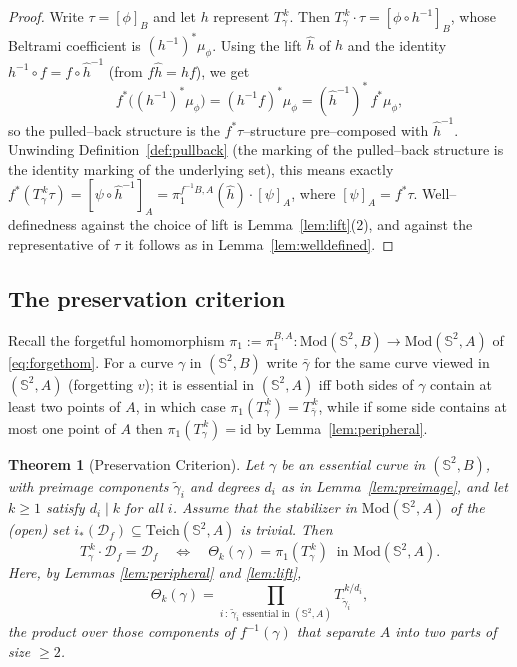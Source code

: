 \documentclass[11pt]{amsart}
\theoremstyle{plain}
\newtheorem{theorem}{Theorem}[section]
\theoremstyle{definition}
\newcommand{\Sph}{\mathbb{S}^2}
\newcommand{\Teich}{\mathrm{Teich}}
\newcommand{\Mod}{\mathrm{Mod}}
\newcommand{\D}{\mathcal{D}}
\newcommand{\id}{\mathrm{id}}
\begin{document}
\begin{proof}
Write $\tau=[\phi]_B$ and let $h$ represent $T_\gamma^{\,k}$.  Then
$T_\gamma^{\,k}\cdot\tau=[\phi\circ h^{-1}]_B$, whose Beltrami coefficient
is $(h^{-1})^{*}\mu_\phi$.  Using the lift $\widehat h$ of $h$ and the
identity $h^{-1}\circ f=f\circ\widehat h^{-1}$ (from
$f\widehat h=hf$), we get
$$f^{*}\bigl((h^{-1})^{*}\mu_\phi\bigr)
=(h^{-1}f)^{*}\mu_\phi=(\widehat h^{-1})^{*}\,f^{*}\mu_\phi,$$
so the pulled--back structure is the $f^{*}\tau$--structure pre--composed
with $\widehat h^{-1}$.  Unwinding
Definition~\ref{def:pullback} (the marking of the pulled--back structure is
the identity marking of the underlying set), this means exactly
$f^{*}(T_\gamma^{\,k}\tau)=[\psi\circ\widehat h^{-1}]_A
=\pi_1^{f^{-1}B,A}(\widehat h)\cdot[\psi]_A$,
where $[\psi]_A=f^{*}\tau$.  Well--definedness against the choice of lift
is Lemma~\ref{lem:lift}(2), and against the representative of $\tau$ it
follows as in Lemma~\ref{lem:welldefined}.
\end{proof}

\subsection{The preservation criterion}

Recall the forgetful homomorphism
$\pi_1:=\pi_1^{B,A}:\Mod(\Sph,B)\to\Mod(\Sph,A)$ of \eqref{eq:forgethom}.
For a curve $\gamma$ in $(\Sph,B)$ write $\bar\gamma$ for the same curve
viewed in $(\Sph,A)$ (forgetting $v$); it is essential in $(\Sph,A)$ iff
both sides of $\gamma$ contain at least two points of $A$, in which case
$\pi_1(T_\gamma^{\,k})=T_{\bar\gamma}^{\,k}$, while if some side contains at
most one point of $A$ then $\pi_1(T_\gamma^{\,k})=\id$ by
Lemma~\ref{lem:peripheral}.

\begin{theorem}[Preservation Criterion]\label{thm:crit}
Let $\gamma$ be an essential curve in $(\Sph,B)$, with preimage components
$\tilde\gamma_i$ and degrees $d_i$ as in Lemma~\ref{lem:preimage}, and let
$k\ge1$ satisfy $d_i\mid k$ for all $i$.  Assume that the stabilizer in
$\Mod(\Sph,A)$ of the (open) set $i_*(\D_f)\subseteq\Teich(\Sph,A)$ is
trivial.  Then
$$T_\gamma^{\,k}\cdot\D_f=\D_f
\quad\Longleftrightarrow\quad
\Theta_k(\gamma)=\pi_1(T_\gamma^{\,k})\ \text{ in }\Mod(\Sph,A).$$
Here, by Lemmas \ref{lem:peripheral} and \ref{lem:lift},
\begin{equation}\label{eq:theta}
\Theta_k(\gamma)=\prod_{i\,:\,\tilde\gamma_i\text{ essential in }(\Sph,A)}
T_{\tilde\gamma_i}^{\,k/d_i},
\end{equation}
the product over those components of $f^{-1}(\gamma)$ that separate $A$
into two parts of size $\ge2$.
\end{theorem}
\end{document}
